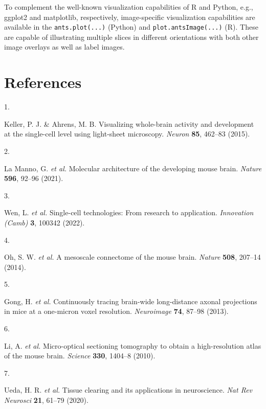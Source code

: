 \documentclass[
  12pt,
]{article}
\newlength{\cslhangindent}
\newlength{\csllabelwidth}
\newenvironment{CSLReferences}[2] %
 {%
  \setlength{\parindent}{0pt}
  \ifodd #1 \everypar{\setlength{\hangindent}{\cslhangindent}}\ignorespaces\fi
  \ifnum #2 > 0
  \setlength{\parskip}{#2\baselineskip}
  \fi
 }%
 {}
\newcommand{\CSLLeftMargin}[1]{\parbox[t]{\csllabelwidth}{#1}}
\newcommand{\CSLRightInline}[1]{\parbox[t]{\linewidth - \csllabelwidth}{#1}\break}
\begin{document}
To complement the well-known visualization capabilities of R and Python,
e.g., ggplot2 and matplotlib, respectively, image-specific visualization
capabilities are available in the \texttt{ants.plot(...)} (Python) and
\texttt{plot.antsImage(...)} (R). These are capable of illustrating
multiple slices in different orientations with both other image overlays
as well as label images.

\clearpage

\hypertarget{references}{%
\section*{References}\label{references}}

\hypertarget{refs}{}
\begin{CSLReferences}{0}{0}
\leavevmode{}%
\CSLLeftMargin{1. }
\CSLRightInline{Keller, P. J. \& Ahrens, M. B. Visualizing whole-brain
activity and development at the single-cell level using light-sheet
microscopy. \emph{Neuron} \textbf{85}, 462--83 (2015).}

\leavevmode{}%
\CSLLeftMargin{2. }
\CSLRightInline{La Manno, G. \emph{et al.} Molecular architecture of the
developing mouse brain. \emph{Nature} \textbf{596}, 92--96 (2021).}

\leavevmode{}%
\CSLLeftMargin{3. }
\CSLRightInline{Wen, L. \emph{et al.} Single-cell technologies: From
research to application. \emph{Innovation (Camb)} \textbf{3}, 100342
(2022).}

\leavevmode{}%
\CSLLeftMargin{4. }
\CSLRightInline{Oh, S. W. \emph{et al.} A mesoscale connectome of the
mouse brain. \emph{Nature} \textbf{508}, 207--14 (2014).}

\leavevmode{}%
\CSLLeftMargin{5. }
\CSLRightInline{Gong, H. \emph{et al.} Continuously tracing brain-wide
long-distance axonal projections in mice at a one-micron voxel
resolution. \emph{Neuroimage} \textbf{74}, 87--98 (2013).}

\leavevmode{}%
\CSLLeftMargin{6. }
\CSLRightInline{Li, A. \emph{et al.} Micro-optical sectioning tomography
to obtain a high-resolution atlas of the mouse brain. \emph{Science}
\textbf{330}, 1404--8 (2010).}

\leavevmode{}%
\CSLLeftMargin{7. }
\CSLRightInline{Ueda, H. R. \emph{et al.} Tissue clearing and its
applications in neuroscience. \emph{Nat Rev Neurosci} \textbf{21},
61--79 (2020).}


\end{CSLReferences}
\end{document}
